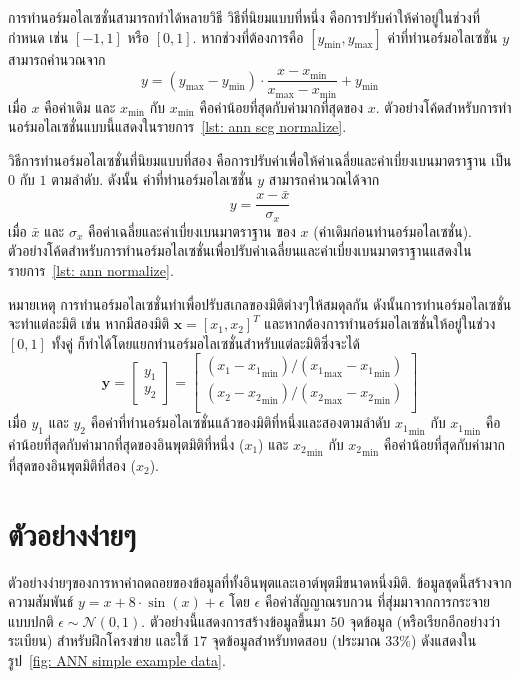 การทำนอร์มอไลเซชั่นสามารถทำได้หลายวิธี 
วิธีที่นิยมแบบที่หนึ่ง คือการปรับค่าให้ค่าอยู่ในช่วงที่กำหนด เช่น $[-1,1]$ หรือ $[0,1]$.
หากช่วงที่ต้องการคือ $[y_{\min}, y_{\max}]$ ค่าที่ทำนอร์มอไลเซชั่น $y$ สามารถคำนวณจาก
\[
   y = (y_{\max} - y_{\min}) \cdot \frac{x - x_{\min}}{x_{\max} - x_{\min}} + y_{\min}
\]
เมื่อ $x$ คือค่าเดิม 
และ
$x_{\min}$ กับ $x_{\min}$ คือค่าน้อยที่สุดกับค่ามากที่สุดของ $x$.
ตัวอย่างโค้ดสำหรับการทำนอร์มอไลเซชั่นแบบนี้แสดงในรายการ~\ref{lst: ann scg normalize}. %

วิธีการทำนอร์มอไลเซชั่นที่นิยมแบบที่สอง คือการปรับค่าเพื่อให้ค่าเฉลี่ยและค่าเบี่ยงเบนมาตราฐาน เป็น $0$ กับ $1$ ตามลำดับ.
ดังนั้น ค่าที่ทำนอร์มอไลเซชั่น $y$ สามารถคำนวณได้จาก
\[
   y = \frac{x - \bar{x}}{\sigma_x}
\]
เมื่อ $\bar{x}$ และ $\sigma_x$ คือค่าเฉลี่ยและค่าเบี่ยงเบนมาตราฐาน ของ $x$ (ค่าเดิมก่อนทำนอร์มอไลเซชั่น).
ตัวอย่างโค้ดสำหรับการทำนอร์มอไลเซชั่นเพื่อปรับค่าเฉลี่ยนและค่าเบี่ยงเบนมาตราฐานแสดงในรายการ~\ref{lst: ann normalize}.

หมายเหตุ การทำนอร์มอไลเซชั่นทำเพื่อปรับสเกลของมิติต่างๆให้สมดุลกัน 
ดังนั้นการทำนอร์มอไลเซชั่นจะทำแต่ละมิติ 
เช่น หากมีสองมิติ $\mathbf{x} = [x_1, x_2]^T$ และหากต้องการทำนอร์มอไลเซชั่นให้อยู่ในช่วง $[0,1]$ ทั้งคู่ ก็ทำได้โดยแยกทำนอร์มอไลเซชั่นสำหรับแต่ละมิติซึ่งจะได้
\[
   \mathbf{y} = \begin{bmatrix}
   y_1 \\
   y_2
   \end{bmatrix}
   = \begin{bmatrix}
   (x_1 - {x_1}_{\min})/({x_1}_{\max} - {x_1}_{\min}) \\
   (x_2 - {x_2}_{\min})/({x_2}_{\max} - {x_2}_{\min}) \\
   \end{bmatrix}
\]
เมื่อ 
$y_1$ และ $y_2$ คือค่าที่ทำนอร์มอไลเซชั่นแล้วของมิติที่หนึ่งและสองตามลำดับ
${x_1}_{\min}$ กับ ${x_1}_{\min}$ คือค่าน้อยที่สุดกับค่ามากที่สุดของอินพุตมิติที่หนึ่ง ($x_1$) 
และ ${x_2}_{\min}$ กับ ${x_2}_{\min}$ คือค่าน้อยที่สุดกับค่ามากที่สุดของอินพุตมิติที่สอง ($x_2$).

\section{ตัวอย่างง่ายๆ}
\label{sec: simple example}

ตัวอย่างง่ายๆของการหาค่าถดถอยของข้อมูลที่ทั้งอินพุตและเอาต์พุตมีขนาดหนึ่งมิติ.
ข้อมูลชุดนี้สร้างจากความสัมพันธ์ $y = x + 8 \cdot \sin(x) + \epsilon$ 
โดย $\epsilon$ คือค่าสัญญาณรบกวน ที่สุ่มมาจากการกระจายแบบปกติ $\epsilon \sim \mathcal{N}(0,1)$.
ตัวอย่างนี้แสดงการสร้างข้อมูลขึ้นมา $50$ จุดข้อมูล (หรือเรียกอีกอย่างว่า ระเบียน) สำหรับฝึกโครงข่าย 
และใช้ $17$ จุดข้อมูลสำหรับทดสอบ (ประมาณ $33\%$) ดังแสดงใน รูป~\ref{fig: ANN simple example data}.

